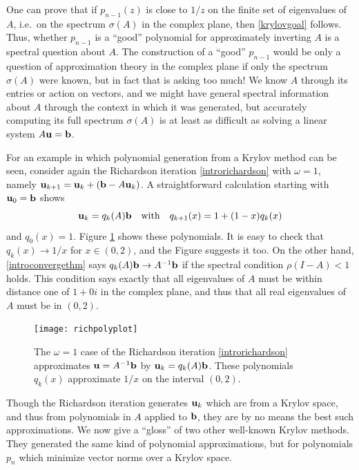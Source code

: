 One can prove that if $p_{n-1}(z)$ is close to $1/z$ on the finite set of eigenvalues of $A$, i.e.~on the spectrum $\sigma(A)$ in the complex plane, then \eqref{krylovgoal} follows.  Thus, whether $p_{n-1}$ is a ``good'' polynomial for approximately inverting $A$ is a spectral question about $A$.  The construction of a ``good'' $p_{n-1}$ would be only a question of approximation theory in the complex plane if only the spectrum $\sigma(A)$ were known, but in fact that is asking too much!  We know $A$ through its entries or action on vectors, and we might have general spectral information about $A$ through the context in which it was generated, but accurately computing its full spectrum $\sigma(A)$ is at least as difficult as solving a linear system $A\mathbf{u}=\mathbf{b}$.

For an example in which polynomial generation from a Krylov method can be seen, consider again the Richardson iteration \eqref{introrichardson} with $\omega=1$, namely $\mathbf{u}_{k+1} = \mathbf{u}_k + (\mathbf{b} - A \mathbf{u}_k)$.  A straightforward calculation starting with $\mathbf{u}_0=\mathbf{b}$ shows
\begin{equation}
	\mathbf{u}_k = q_k(A) \mathbf{b} \quad \text{with} \quad q_{k+1}(x) = 1 + (1-x) q_k(x)  \label{richpolys}
\end{equation}
and $q_0(x)=1$.
Figure \ref{fig:richpolyplot} shows these polynomials.  It is easy to check that $q_k(x) \to 1/x$ for $x\in (0,2)$, and the Figure suggests it too.  On the other hand, \eqref{introconvergethm} says $q_k(A) \mathbf{b} \to A^{-1} \mathbf{b}$ if the spectral condition $\rho(I-A)<1$ holds.  This condition says exactly that all eigenvalues of $A$ must be within distance one of $1+0i$ in the complex plane, and thus that all real eigenvalues of $A$ must be in $(0,2)$.

\begin{figure}
\bigskip
\texttt{[image: richpolyplot]}
\caption{The $\omega=1$ case of the Richardson iteration \eqref{introrichardson} approximates $\mathbf{u}=A^{-1}\mathbf{b}$ by $\mathbf{u}_k=q_k(A)\mathbf{b}$.  These polynomials $q_k(x)$ approximate $1/x$ on the interval $(0,2)$.}
\label{fig:richpolyplot}
\end{figure}

Though the Richardson iteration generates $\mathbf{u}_k$ which are from a Krylov space, and thus from polynomials in $A$ applied to $\mathbf{b}$, they are by no means the best such approximations.  We now give a ``gloss'' of two other well-known Krylov methods.  They generated the same kind of polynomial approximations, but for polynomials $p_n$ which minimize vector norms over a Krylov space.

